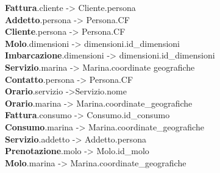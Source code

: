 \textbf{Fattura}.cliente -> Cliente.persona\\
\textbf{Addetto}.persona -> Persona.CF\\
\textbf{Cliente}.persona -> Persona.CF\\
\textbf{Molo}.dimensioni -> dimensioni.id\_dimensioni\\
\textbf{Imbarcazione}.dimensioni -> dimensioni.id\_dimensioni\\
\textbf{Servizio}.marina -> Marina.coordinate geografiche\\
\textbf{Contatto}.persona -> Persona.CF\\
\textbf{Orario}.servizio ->Servizio.nome\\
\textbf{Orario}.marina -> Marina.coordinate\_geografiche\\
\textbf{Fattura}.consumo -> Consumo.id\_consumo\\
\textbf{Consumo}.marina -> Marina.coordinate\_geografiche\\
\textbf{Servizio}.addetto -> Addetto.persona\\
\textbf{Prenotazione}.molo -> Molo.id\_molo\\
\textbf{Molo}.marina -> Marina.coordinate\_geografiche\\

